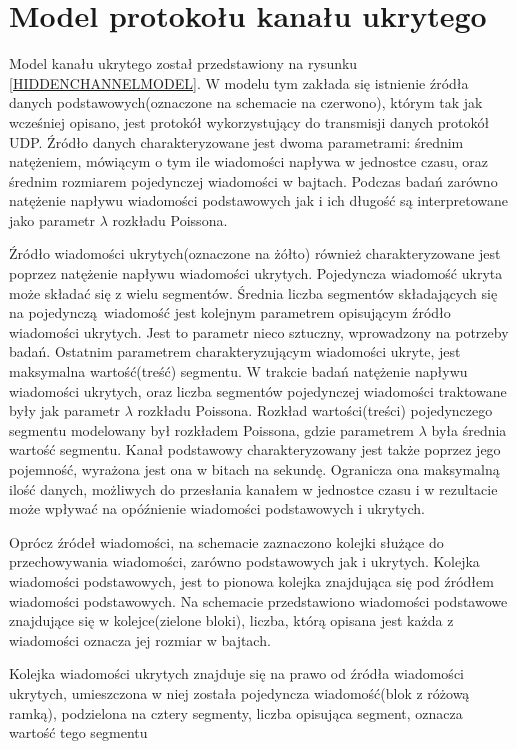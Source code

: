 \documentclass[a4paper, twoside, 12pt]{report}
\begin{document}
    \section{Model protokołu kanału ukrytego}

    Model kanału ukrytego został przedstawiony na rysunku \ref{HIDDENCHANNELMODEL}. W modelu tym zakłada się
    istnienie źródła danych podstawowych(oznaczone na schemacie na czerwono),
    którym tak jak wcześniej opisano, jest
    protokół wykorzystujący do transmisji danych protokół UDP. Źródło danych
    charakteryzowane jest dwoma parametrami: średnim natężeniem, mówiącym
    o tym ile wiadomości napływa w jednostce czasu, oraz średnim rozmiarem
    pojedynczej wiadomości w bajtach. Podczas badań zarówno natężenie napływu wiadomości
    podstawowych jak i ich długość są interpretowane jako parametr \(\lambda \) rozkładu
    Poissona.

    Źródło wiadomości ukrytych(oznaczone na żółto) również charakteryzowane jest poprzez natężenie
    napływu wiadomości ukrytych. Pojedyncza wiadomość ukryta może składać się z wielu
    segmentów. Średnia liczba segmentów składających się na pojedynczą wiadomość
    jest kolejnym parametrem opisującym źródło wiadomości ukrytych. Jest to parametr
    nieco sztuczny, wprowadzony na potrzeby badań. Ostatnim parametrem charakteryzującym
    wiadomości ukryte, jest maksymalna wartość(treść) segmentu. W trakcie badań
    natężenie napływu wiadomości ukrytych, oraz liczba segmentów pojedynczej wiadomości
    traktowane były jak parametr \(\lambda \) rozkładu Poissona. Rozkład wartości(treści)
    pojedynczego segmentu modelowany był rozkładem Poissona, gdzie parametrem \(\lambda\) była
    średnia wartość segmentu. Kanał podstawowy charakteryzowany jest także
    poprzez jego pojemność, wyrażona jest ona w bitach na sekundę. Ogranicza ona
    maksymalną ilość danych, możliwych do przesłania kanałem w jednostce czasu i
    w rezultacie może wpływać na opóźnienie wiadomości podstawowych i ukrytych.

    Oprócz źródeł wiadomości, na schemacie zaznaczono kolejki służące do przechowywania
    wiadomości, zarówno podstawowych jak i ukrytych. Kolejka wiadomości podstawowych,
    jest to pionowa kolejka znajdująca się pod źródłem wiadomości podstawowych.
    Na schemacie przedstawiono wiadomości podstawowe znajdujące się w kolejce(zielone bloki),
    liczba, którą opisana jest każda z wiadomości oznacza jej rozmiar w bajtach.

    Kolejka wiadomości ukrytych znajduje się na prawo od źródła wiadomości ukrytych,
    umieszczona w niej została pojedyncza wiadomość(blok z różową ramką), podzielona
    na cztery segmenty, liczba opisująca segment, oznacza wartość tego segmentu
\end{document}
